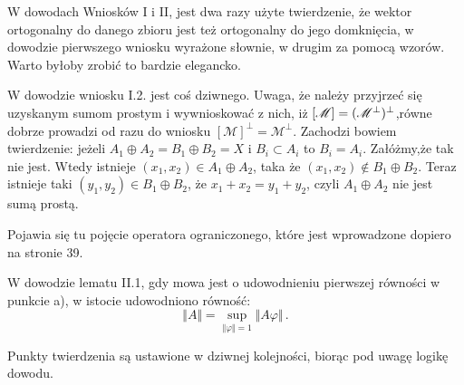 \documentclass[a4paper,11pt]{article}
\begin{document}
\vspace{\spaceFour}



 W dowodach Wniosków I i II, jest dwa razy użyte
twierdzenie, że wektor ortogonalny do danego zbioru jest też
ortogonalny do jego domknięcia, w dowodzie pierwszego wniosku
wyrażone słownie, w drugim za pomocą wzorów. Warto byłoby zrobić to
bardzie elegancko.

\vspace{\spaceFour}



 W dowodzie wniosku I.2. jest coś dziwnego. Uwaga, że
należy przyjrzeć się uzyskanym sumom prostym i wywnioskować z nich,
iż $[ \mathcal{M} ]=( \mathcal{M}^{ \bot } )^{ \bot }$,równe
dobrze prowadzi od razu do wniosku
$[ \mathcal{ M } ]^{ \bot } = \mathcal{ M }^{ \bot }$. Zachodzi
bowiem twierdzenie: jeżeli
$A_{ 1 } \oplus A_{ 2 } = B_{ 1 } \oplus B_{ 2 } = X$ i
$B_{ i } \subset A_{ i }$ to $B_{ i } = A_{ i }$. Załóżmy,że tak nie
jest. Wtedy istnieje
$( x_{ 1 }, x_{ 2 } ) \in A_{ 1 } \oplus A_{ 2 }$, taka że
$( x_{ 1 }, x_{ 2 } ) \notin B_{ 1 } \oplus B_{ 2 }$. Teraz istnieje
taki $( y_{ 1 }, y_{ 2 } ) \in B_{ 1 } \oplus B_{ 2 }$, że
$x_{ 1 } + x_{ 2 } = y_{ 1 } + y_{ 2 }$, czyli
$A_{ 1 } \oplus A_{ 2 }$ nie jest sumą prostą.

\vspace{\spaceFour}



 Pojawia się tu pojęcie operatora ograniczonego, które
jest wprowadzone dopiero na stronie 39.

\vspace{\spaceFour}



 W dowodzie lematu II.1, gdy mowa jest o udowodnieniu
pierwszej równości w punkcie a), w istocie udowodniono równość:
\begin{equation}
  \label{eq:GrabowskiIngarden-01}
  \Vert A \Vert = \sup_{ \Vert \varphi \Vert = 1 } \Vert A \varphi \Vert \, .
\end{equation}

\vspace{\spaceFour}



 Punkty twierdzenia są ustawione w dziwnej kolejności,
biorąc pod uwagę logikę dowodu.

\vspace{\spaceFour}
\end{document}
